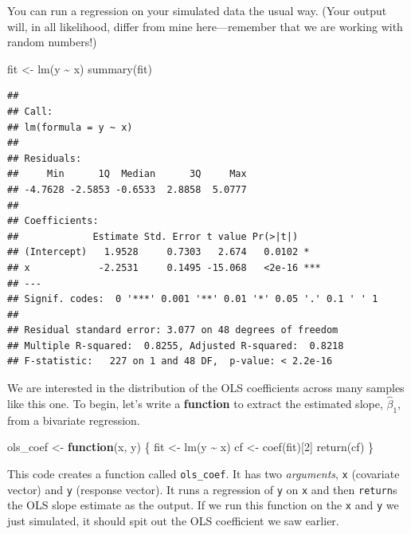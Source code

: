 \documentclass[
  12pt,
  oneside,openany]{book}
\newenvironment{Shaded}{\begin{snugshade}}{\end{snugshade}}
\newcommand{\ControlFlowTok}[1]{\textcolor[rgb]{0.13,0.29,0.53}{\textbf{#1}}}
\newcommand{\DecValTok}[1]{\textcolor[rgb]{0.00,0.00,0.81}{#1}}
\newcommand{\FunctionTok}[1]{\textcolor[rgb]{0.00,0.00,0.00}{#1}}
\newcommand{\NormalTok}[1]{#1}
\newcommand{\OtherTok}[1]{\textcolor[rgb]{0.56,0.35,0.01}{#1}}
\newcommand{\SpecialCharTok}[1]{\textcolor[rgb]{0.00,0.00,0.00}{#1}}
\begin{document}
You can run a regression on your simulated data the usual way.
(Your output will, in all likelihood, differ from mine here---remember that we are working with random numbers!)

\begin{Shaded}
\begin{Highlighting}[]
\NormalTok{fit }\OtherTok{\textless{}{-}} \FunctionTok{lm}\NormalTok{(y }\SpecialCharTok{\textasciitilde{}}\NormalTok{ x)}
\FunctionTok{summary}\NormalTok{(fit)}
\end{Highlighting}
\end{Shaded}

\begin{verbatim}
## 
## Call:
## lm(formula = y ~ x)
## 
## Residuals:
##     Min      1Q  Median      3Q     Max 
## -4.7628 -2.5853 -0.6533  2.8858  5.0777 
## 
## Coefficients:
##             Estimate Std. Error t value Pr(>|t|)    
## (Intercept)   1.9528     0.7303   2.674   0.0102 *  
## x            -2.2531     0.1495 -15.068   <2e-16 ***
## ---
## Signif. codes:  0 '***' 0.001 '**' 0.01 '*' 0.05 '.' 0.1 ' ' 1
## 
## Residual standard error: 3.077 on 48 degrees of freedom
## Multiple R-squared:  0.8255, Adjusted R-squared:  0.8218 
## F-statistic:   227 on 1 and 48 DF,  p-value: < 2.2e-16
\end{verbatim}

We are interested in the distribution of the OLS coefficients across many samples like this one.
To begin, let's write a \textbf{function} to extract the estimated slope, \(\hat{\beta}_1\), from a bivariate regression.

\begin{Shaded}
\begin{Highlighting}[]
\NormalTok{ols\_coef }\OtherTok{\textless{}{-}} \ControlFlowTok{function}\NormalTok{(x, y) \{}
\NormalTok{  fit }\OtherTok{\textless{}{-}} \FunctionTok{lm}\NormalTok{(y }\SpecialCharTok{\textasciitilde{}}\NormalTok{ x)}
\NormalTok{  cf }\OtherTok{\textless{}{-}} \FunctionTok{coef}\NormalTok{(fit)[}\DecValTok{2}\NormalTok{]}
  \FunctionTok{return}\NormalTok{(cf)}
\NormalTok{\}}
\end{Highlighting}
\end{Shaded}

This code creates a function called \texttt{ols\_coef}.
It has two \emph{arguments}, \texttt{x} (covariate vector) and \texttt{y} (response vector).
It runs a regression of \texttt{y} on \texttt{x} and then \texttt{return}s the OLS slope estimate as the output.
If we run this function on the \texttt{x} and \texttt{y} we just simulated, it should spit out the OLS coefficient we saw earlier.
\end{document}

